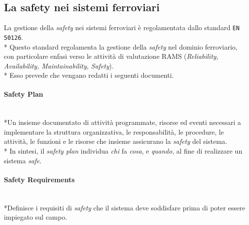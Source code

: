 \subsection{La safety nei sistemi ferroviari}
La gestione della \emph{safety} nei sistemi ferroviari \`e regolamentata dallo standard \texttt{EN 50126}. \cite{50126}\\*
Questo standard regolamenta la gestione della \emph{safety} nel dominio ferroviario, con particolare enfasi verso le attivit\`a di valutazione RAMS (\emph{Reliability, Availability, Maintainability, Safety}).\\*
Esso prevede che vengano redatti i seguenti documenti.
\paragraph{Safety Plan}\mbox{}\\*Un insieme documentato di attivit\`a programmate, risorse ed eventi necessari a implementare la struttura organizzativa, le responsabilit\`a, le procedure, le attivit\`a, le funzioni e le risorse che insieme assicurano la \emph{safety} del sistema.\\*
In sintesi, il \emph{safety plan} individua \emph{chi} fa \emph{cosa}, e \emph{quando}, al fine di realizzare un sistema \emph{safe}.
\paragraph{Safety Requirements}\mbox{}\\*Definisce i requisiti di \emph{safety} che il sistema deve soddisfare prima di poter essere impiegato sul campo.
